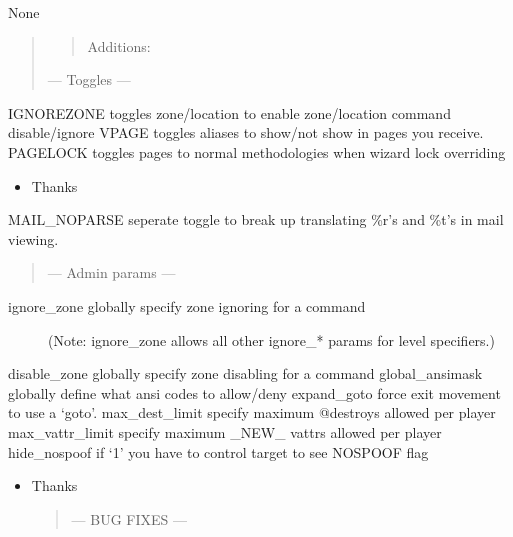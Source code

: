 \documentclass[letterpaper,10pt,english]{sphinxmanual}
\begin{document}
\sphinxAtStartPar
None
\begin{quote}
\begin{quote}

\sphinxAtStartPar
Additions:
\end{quote}

\sphinxAtStartPar
— Toggles —
\end{quote}

\sphinxAtStartPar
IGNOREZONE \sphinxhyphen{} toggles zone/location to enable zone/location command disable/ignore
VPAGE \sphinxhyphen{} toggles aliases to show/not show in pages you receive.
PAGELOCK \sphinxhyphen{} toggles pages to normal methodologies when wizard lock overriding
\begin{itemize}
\item {} 
\sphinxAtStartPar
Thanks 

\end{itemize}

\sphinxAtStartPar
MAIL\_NOPARSE \sphinxhyphen{} seperate toggle to break up translating \%r’s and \%t’s in mail viewing.
\begin{quote}

\sphinxAtStartPar
— Admin params —
\end{quote}
\begin{description}
\item[{ignore\_zone \sphinxhyphen{} globally specify zone ignoring for a command}] \leavevmode
\sphinxAtStartPar
(Note: ignore\_zone allows all other ignore\_* params for level specifiers.)

\end{description}

\sphinxAtStartPar
disable\_zone \sphinxhyphen{} globally specify zone disabling for a command
global\_ansimask \sphinxhyphen{} globally define what ansi codes to allow/deny
expand\_goto \sphinxhyphen{} force exit movement to use a ‘goto’.
max\_dest\_limit \sphinxhyphen{} specify maximum @destroys allowed per player
max\_vattr\_limit \sphinxhyphen{} specify maximum \_NEW\_ vattrs allowed per player
hide\_nospoof \sphinxhyphen{} if ‘1’ you have to control target to see NOSPOOF flag
\begin{itemize}
\item {} 
\sphinxAtStartPar
Thanks 
\begin{quote}

\sphinxAtStartPar
— BUG FIXES —
\end{quote}

\end{itemize}
\end{document}
